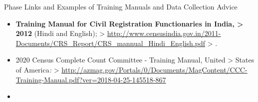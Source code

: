 \documentclass[
]{article}
\begin{document}
Phase Links and Examples of Training Manuals and Data Collection Advice

\begin{itemize}
\item
  \textbf{Training Manual for Civil Registration Functionaries in India,
  \textgreater{} 2012} (Hindi and English);
  \textgreater{} \url{http://www.censusindia.gov.in/2011-Documents/CRS_Report/CRS_mannual_Hindi_English.pdf}
  \textgreater{} .
\item
  2020 Census Complete Count Committee - Training Manual, United
  \textgreater{} States of America\emph{:}
  \textgreater{} \url{http://azmag.gov/Portals/0/Documents/MagContent/CCC-Training-Manual.pdf?ver=2018-04-25-145518-867}
\item ~
  \hypertarget{jips-data-collection-advice.-implementing-data-collection---operational-plan-for-data-collection.-this-document-outlines-an-operational-plan-for-the-data-collection-phase-of-the-household-survey-during-a-profiling-exercise.-this-document-helps-plan-out-how-the-fieldwork-will-actually-be-conducted.-it-includes-the-operational-structure-showing-how-the-implementingdata-collection-partners-fit-in-the-roles-and-responsibilities-for-the-various-actors-involved-and-the-work-plan-for-the-next-steps.-httpsjet.jips.orgphaseimplementing-data-collection}{%
}
\end{itemize}
\end{document}
